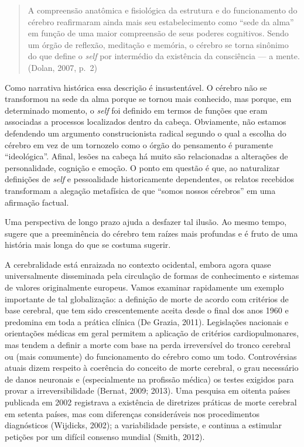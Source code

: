 \begin{quote}
A compreensão anatômica e fisiológica da estrutura e do funcionamento do
cérebro reafirmaram ainda mais seu estabelecimento como ``sede da alma''
em função de uma maior compreensão de seus poderes cognitivos. Sendo um
órgão de reflexão, meditação e memória, o cérebro se torna sinônimo do
que define o \emph{self} por intermédio da existência da consciência --- a
mente. (Dolan, 2007, p.~2)
\end{quote}

Como narrativa histórica essa descrição é insustentável. O cérebro não
se transformou na sede da alma porque se tornou mais conhecido, mas
porque, em determinado momento, o \emph{self} foi definido em termos de funções
que eram associadas a processos localizados dentro da cabeça.
Obviamente, não estamos defendendo um argumento construcionista radical
segundo o qual a escolha do cérebro em vez de um tornozelo como o órgão
do pensamento é puramente ``ideológica''. Afinal, lesões na cabeça há
muito são relacionadas a alterações de personalidade, cognição e emoção.
O ponto em questão é que, ao naturalizar definições de \emph{self} e
pessoalidade historicamente dependentes, os relatos recebidos transformam
a alegação metafísica de que ``somos nossos cérebros'' em uma afirmação
factual.

Uma perspectiva de longo prazo ajuda a desfazer tal ilusão. Ao mesmo
tempo, sugere que a preeminência do cérebro tem raízes mais profundas e
é fruto de uma história mais longa do que se costuma sugerir.

A cerebralidade está enraizada no contexto ocidental,
embora agora quase universalmente disseminada pela circulação de formas
de conhecimento e sistemas de valores originalmente europeus. Vamos
examinar rapidamente um exemplo importante de tal globalização: a
definição de morte de acordo com critérios de base cerebral, que tem
sido crescentemente aceita desde o final dos anos 1960 e predomina em
toda a prática clínica (De Grazia, 2011). Legislações nacionais e
orientações médicas em geral permitem a aplicação de critérios
cardiopulmonares, mas tendem a definir a morte com base na perda
irreversível do tronco cerebral ou (mais comumente) do funcionamento do
cérebro como um todo. Controvérsias atuais dizem respeito à coerência do
conceito de morte cerebral, o grau necessário de danos neuronais e
(especialmente na profissão médica) os testes exigidos para provar a
irreversibilidade (Bernat, 2009; 2013). Uma pesquisa em oitenta países
publicada em 2002 registrava a existência de diretrizes práticas de
morte cerebral em setenta países, mas com diferenças consideráveis nos
procedimentos diagnósticos (Wijdicks, 2002); a variabilidade persiste, e
continua a estimular petições por um difícil consenso mundial (Smith,
2012).

